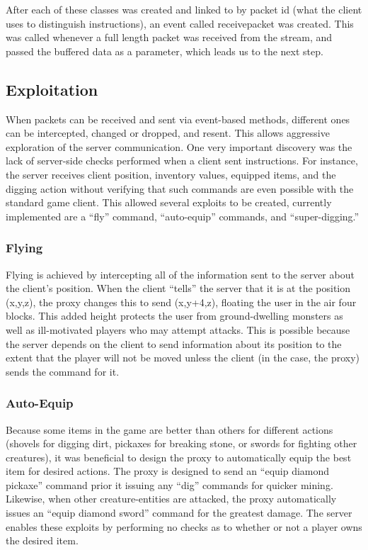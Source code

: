 \documentclass[12pt]{article}
\begin{document}
After each of these classes was created and linked to by packet id (what the client uses to distinguish instructions), an event called receive\textunderscore{}packet was created. This was called whenever a full length packet was received from the stream, and passed the buffered data as a parameter, which leads us to the next step.

\subsection{Exploitation}
When packets can be received and sent via event-based methods, different ones can be intercepted, changed or dropped, and resent. This allows aggressive exploration of the server communication. One very important discovery was the lack of server-side checks performed when a client sent instructions. For instance, the server receives client position, inventory values, equipped items, and the digging action without verifying that such commands are even possible with the standard game client. This allowed several exploits to be created, currently implemented are a ``fly'' command, ``auto-equip'' commands, and ``super-digging.''

\subsubsection{Flying}
Flying is achieved by intercepting all of the information sent to the server about the client's position. When the client ``tells'' the server that it is at the position (x,y,z), the proxy changes this to send (x,y+4,z), floating the user in the air four blocks. This added height protects the user from ground-dwelling monsters as well as ill-motivated players who may attempt attacks. This is possible because the server depends on the client to send information about its position to the extent that the player will not be moved unless the client (in the case, the proxy) sends the command for it.

\subsubsection{Auto-Equip}
Because some items in the game are better than others for different actions (shovels for digging dirt, pickaxes for breaking stone, or swords for fighting other creatures), it was beneficial to design the proxy to automatically equip the best item for desired actions. The proxy is designed to send an ``equip diamond pickaxe'' command prior it issuing any ``dig'' commands for quicker mining. Likewise, when other creature-entities are attacked, the proxy automatically issues an ``equip diamond sword'' command for the greatest damage. The server enables these exploits by performing no checks as to whether or not a player owns the desired item.
\end{document}
